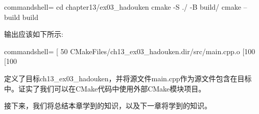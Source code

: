\begin{tcblisting}{commandshell={}}
cd chapter13/ex03_hadouken
cmake -S ./ -B build/
cmake --build build
\end{tcblisting}

输出应该如下所示:

\begin{tcblisting}{commandshell={}}
[ 50%
  CMakeFiles/ch13_ex03_hadouken.dir/src/main.cpp.o
[100%
[100%
\end{tcblisting}

定义了目标ch13\_ex03\_hadouken，并将源文件main.cpp作为源文件包含在目标中。证实了我们可以在CMake代码中使用外部CMake模块项目。

接下来，我们将总结本章学到的知识，以及下一章将学到的知识。











